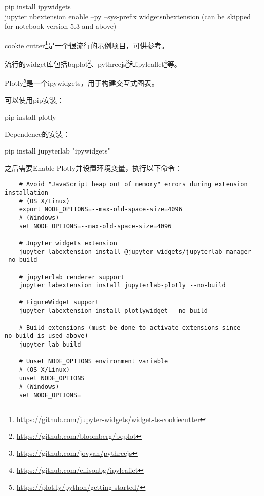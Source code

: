 \begin{tcolorbox}
    pip install ipywidgets \\
    jupyter nbextension enable --py --sys-prefix widgetsnbextension  (can be skipped for notebook version 5.3 and above)
\end{tcolorbox}

cookie cutter\footnote{\url{https://github.com/jupyter-widgets/widget-ts-cookiecutter}}是一个很流行的示例项目，可供参考。

流行的widget库包括bqplot\footnote{\url{https://github.com/bloomberg/bqplot}}、pythreejs\footnote{\url{https://github.com/jovyan/pythreejs}}和ipyleaflet\footnote{\url{https://github.com/ellisonbg/ipyleaflet}}等。

Plotly\footnote{\url{https://plot.ly/python/getting-started/}}是一个ipywidgets，用于构建交互式图表。

可以使用pip安装：

\begin{tcolorbox}
    pip install plotly
\end{tcolorbox}

Dependence的安装：

\begin{tcolorbox}
    pip install jupyterlab "ipywidgets"
\end{tcolorbox}

之后需要Enable Plotly并设置环境变量，执行以下命令：

\begin{verbatim}
    # Avoid "JavaScript heap out of memory" errors during extension installation
    # (OS X/Linux)
    export NODE_OPTIONS=--max-old-space-size=4096
    # (Windows)
    set NODE_OPTIONS=--max-old-space-size=4096

    # Jupyter widgets extension
    jupyter labextension install @jupyter-widgets/jupyterlab-manager --no-build

    # jupyterlab renderer support
    jupyter labextension install jupyterlab-plotly --no-build

    # FigureWidget support
    jupyter labextension install plotlywidget --no-build

    # Build extensions (must be done to activate extensions since --no-build is used above)
    jupyter lab build

    # Unset NODE_OPTIONS environment variable
    # (OS X/Linux)
    unset NODE_OPTIONS
    # (Windows)
    set NODE_OPTIONS=
\end{verbatim}

